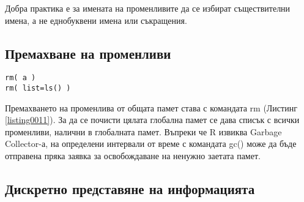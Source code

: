 Добра практика е за имената на променливите да се избират съществителни имена, а не еднобуквени имена или съкращения.

\subsection{Премахване на променливи}

\begin{lstlisting}[caption=Премахване на променливи от глобалната памет, label=listing0011]
rm( a )
rm( list=ls() )
\end{lstlisting}

Премахването на променлива от общата памет става с командата rm (Листинг \ref{listing0011}). За да се почисти цялата глобална памет се дава списък с всички променливи, налични в глобалната памет. Въпреки че R извиква Garbage Collector-а, на определени интервали от време с командата gc() може да бъде отправена пряка заявка за освобождаване на ненужно заетата памет.

\subsection{Дискретно представяне на информацията}

